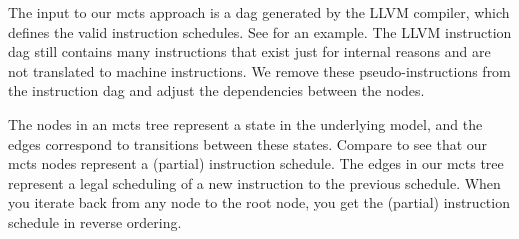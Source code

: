 The input to our \ac{mcts} approach is a \ac{dag} generated by the LLVM compiler, which defines the valid instruction schedules.
See  for an example.
The LLVM instruction \ac{dag} still contains many instructions that exist just for internal reasons and are not translated to machine instructions.
We remove these pseudo-instructions from the instruction \ac{dag} and adjust the dependencies between the nodes.

The nodes in an \ac{mcts} tree represent a state in the underlying model, and the edges correspond to transitions between these states.
Compare  to see that our \ac{mcts} nodes represent a (partial) instruction schedule.
The edges in our \ac{mcts} tree represent a legal scheduling of a new instruction to the previous schedule.
When you iterate back from any node to the root node, you get the (partial) instruction schedule in reverse ordering.
